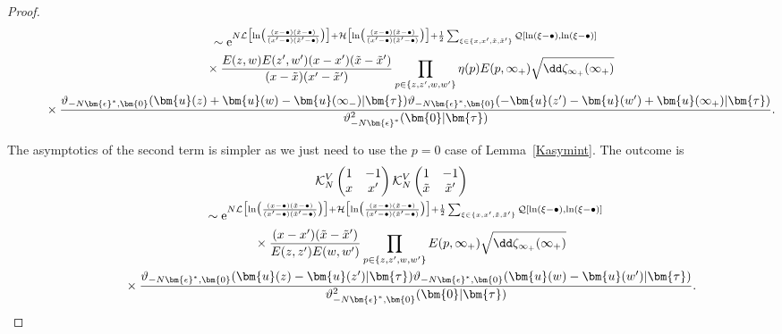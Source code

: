 \documentclass[pdftex]{sigma}
\numberwithin{equation}{section}
\begin{document}
\begin{proof}
\begin{gather}
 \qquad{}\sim{\rm e}^{N\mathcal{L}\bigl[\ln\bigl(\frac{(x - \bullet)(\tilde{x} - \bullet)}{(x' - \bullet)(\tilde{x}' - \bullet)}\bigr)\bigr] + \mathcal{H}\bigl[\ln\bigl(\frac{(x - \bullet)(\tilde{x} - \bullet)}{(x' - \bullet)(\tilde{x}' - \bullet)}\bigr)\bigr] + \frac{1}{2} \sum_{\xi \in \{x,x',\tilde{x},\tilde{x}'\}} \mathcal{Q}[\ln(\xi - \bullet),\ln(\xi - \bullet)]} \nonumber\\
 \qquad\quad{}\times \frac{E(z,w)E(z',w')(x - x')(\tilde{x} - \tilde{x}')}{(x - \tilde{x})(x' - \tilde{x}')} \prod_{p \in \{z,z',w,w'\}} \eta(p)E(p,\infty_+)\sqrt{\dd \zeta_{\infty_+}(\infty_+)} \nonumber\\
\qquad\quad{} \times \frac{\vartheta_{-N\bm{\epsilon}^*,\bm{0}} (\bm{u}(z) + \bm{u}(w) - \bm{u}(\infty_-) |\bm{\tau} )\vartheta_{-N \bm{\epsilon}^*,\bm{0}} ( - \bm{u}(z') - \bm{u}(w') + \bm{u}(\infty_+) |\bm{\tau} )}{\vartheta_{-N\bm{\epsilon}^*}^2 (\bm{0} |\bm{\tau} )}.\label{T2}
\end{gather}

The asymptotics of the second term is simpler as we just need to use the $p = 0$ case of Lemma~\ref{Kasymint}. The outcome is
\begin{gather}
\mathcal{K}_{N}^{V}\left(\begin{matrix} 1 & -1 \\ x & x' \end{matrix}\right)\mathcal{K}_{N}^{V}\left(\begin{matrix} 1 & -1 \\ \tilde{x} & \tilde{x}' \end{matrix}\right) \nonumber\\
\qquad {} \sim{\rm e}^{N\mathcal{L}\bigl[\ln\bigl(\frac{(x - \bullet)(\tilde{x} - \bullet)}{(x' - \bullet)(\tilde{x}' - \bullet)}\bigr)\bigr] + \mathcal{H}\bigl[\ln\bigl(\frac{(x - \bullet)(\tilde{x} - \bullet)}{(x' - \bullet)(\tilde{x}' - \bullet)}\bigr)\bigr] + \frac{1}{2} \sum_{\xi \in \{x,x',\tilde{x},\tilde{x}'\}} \mathcal{Q}[\ln(\xi - \bullet),\ln(\xi - \bullet)]} \nonumber\\
\qquad\quad{} \times \frac{(x - x')(\tilde{x} - \tilde{x}')}{E(z,z')E(w,w')} \prod_{p \in \{z,z',w,w'\}} E(p,\infty_+)\sqrt{\dd \zeta_{\infty_+}(\infty_+)} \nonumber\\
\qquad\quad{} \times \frac{\vartheta_{-N\bm{\epsilon}^*,\bm{0}} (\bm{u}(z) - \bm{u}(z')  |\bm{\tau} )\vartheta_{-N\bm{\epsilon}^*,\bm{0}} (\bm{u}(w) - \bm{u}(w') |\bm{\tau} )}{\vartheta_{-N\bm{\epsilon}^*,\bm{0}}^2 (\bm{0} |\bm{\tau} )}.\label{T3}
\end{gather}


\end{proof}
\end{document}
